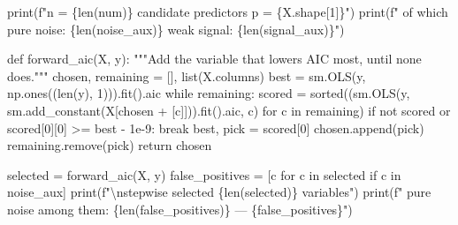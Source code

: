 \documentclass[
  letterpaper,
  10pt,
  twoside,
  openright,
  numbers=noenddot,
  chapterprefix=true]{scrbook}
\newenvironment{Shaded}{}{}
\newcommand{\BuiltInTok}[1]{\textcolor[rgb]{0.84,0.23,0.29}{#1}}
\newcommand{\CharTok}[1]{\textcolor[rgb]{0.01,0.18,0.38}{#1}}
\newcommand{\CommentTok}[1]{\textcolor[rgb]{0.42,0.45,0.49}{#1}}
\newcommand{\ControlFlowTok}[1]{\textcolor[rgb]{0.84,0.23,0.29}{#1}}
\newcommand{\DecValTok}[1]{\textcolor[rgb]{0.00,0.36,0.77}{#1}}
\newcommand{\FloatTok}[1]{\textcolor[rgb]{0.00,0.36,0.77}{#1}}
\newcommand{\KeywordTok}[1]{\textcolor[rgb]{0.84,0.23,0.29}{#1}}
\newcommand{\NormalTok}[1]{\textcolor[rgb]{0.14,0.16,0.18}{#1}}
\newcommand{\OperatorTok}[1]{\textcolor[rgb]{0.14,0.16,0.18}{#1}}
\newcommand{\SpecialCharTok}[1]{\textcolor[rgb]{0.00,0.36,0.77}{#1}}
\newcommand{\SpecialStringTok}[1]{\textcolor[rgb]{0.01,0.18,0.38}{#1}}
\begin{document}
\begin{Shaded}
\begin{Highlighting}[]
\BuiltInTok{print}\NormalTok{(}\SpecialStringTok{f"n = }\SpecialCharTok{\{}\BuiltInTok{len}\NormalTok{(num)}\SpecialCharTok{\}}\SpecialStringTok{   candidate predictors p = }\SpecialCharTok{\{}\NormalTok{X}\SpecialCharTok{.}\NormalTok{shape[}\DecValTok{1}\NormalTok{]}\SpecialCharTok{\}}\SpecialStringTok{"}\NormalTok{)}
\BuiltInTok{print}\NormalTok{(}\SpecialStringTok{f"   of which pure noise: }\SpecialCharTok{\{}\BuiltInTok{len}\NormalTok{(noise\_aux)}\SpecialCharTok{\}}\SpecialStringTok{   weak signal: }\SpecialCharTok{\{}\BuiltInTok{len}\NormalTok{(signal\_aux)}\SpecialCharTok{\}}\SpecialStringTok{"}\NormalTok{)}


\KeywordTok{def}\NormalTok{ forward\_aic(X, y):}
    \CommentTok{"""Add the variable that lowers AIC most, until none does."""}
\NormalTok{    chosen, remaining }\OperatorTok{=}\NormalTok{ [], }\BuiltInTok{list}\NormalTok{(X.columns)}
\NormalTok{    best }\OperatorTok{=}\NormalTok{ sm.OLS(y, np.ones((}\BuiltInTok{len}\NormalTok{(y), }\DecValTok{1}\NormalTok{))).fit().aic}
    \ControlFlowTok{while}\NormalTok{ remaining:}
\NormalTok{        scored }\OperatorTok{=} \BuiltInTok{sorted}\NormalTok{((sm.OLS(y, sm.add\_constant(X[chosen }\OperatorTok{+}\NormalTok{ [c]])).fit().aic, c)}
                        \ControlFlowTok{for}\NormalTok{ c }\KeywordTok{in}\NormalTok{ remaining)}
        \ControlFlowTok{if} \KeywordTok{not}\NormalTok{ scored }\KeywordTok{or}\NormalTok{ scored[}\DecValTok{0}\NormalTok{][}\DecValTok{0}\NormalTok{] }\OperatorTok{\textgreater{}=}\NormalTok{ best }\OperatorTok{{-}} \FloatTok{1e{-}9}\NormalTok{:}
            \ControlFlowTok{break}
\NormalTok{        best, pick }\OperatorTok{=}\NormalTok{ scored[}\DecValTok{0}\NormalTok{]}
\NormalTok{        chosen.append(pick)}
\NormalTok{        remaining.remove(pick)}
    \ControlFlowTok{return}\NormalTok{ chosen}


\NormalTok{selected }\OperatorTok{=}\NormalTok{ forward\_aic(X, y)}
\NormalTok{false\_positives }\OperatorTok{=}\NormalTok{ [c }\ControlFlowTok{for}\NormalTok{ c }\KeywordTok{in}\NormalTok{ selected }\ControlFlowTok{if}\NormalTok{ c }\KeywordTok{in}\NormalTok{ noise\_aux]}
\BuiltInTok{print}\NormalTok{(}\SpecialStringTok{f"}\CharTok{\textbackslash{}n}\SpecialStringTok{stepwise selected }\SpecialCharTok{\{}\BuiltInTok{len}\NormalTok{(selected)}\SpecialCharTok{\}}\SpecialStringTok{ variables"}\NormalTok{)}
\BuiltInTok{print}\NormalTok{(}\SpecialStringTok{f"   pure noise among them: }\SpecialCharTok{\{}\BuiltInTok{len}\NormalTok{(false\_positives)}\SpecialCharTok{\}}\SpecialStringTok{ — }\SpecialCharTok{\{}\NormalTok{false\_positives}\SpecialCharTok{\}}\SpecialStringTok{"}\NormalTok{)}
\end{Highlighting}
\end{Shaded}
\end{document}
